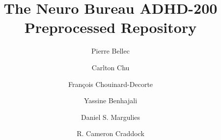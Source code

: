 \documentclass[preprint,12pt,3p]{elsarticle}
\begin{document}
\begin{frontmatter}

\title{The Neuro Bureau ADHD-200 Preprocessed Repository}


\author[label0,label1,label2]{Pierre Bellec}
\address[label0]{The Neuro Bureau}
\address[label1]{Centre de Recherche de l'Institut Universitaire de G\'eriatrie de Montr\'eal, Montr\'eal, CA}
\address[label2]{D\'epartement d'Informatique et de Recherche Op\'erationnelle, Universit\'e de Montr\'eal, Montr\'eal, CA}



\author[label0,label3]{Carlton Chu}
\address[label3]{Google DeepMind, London, UK}

\author[label0,label1,label4]{Fran\c{c}ois Chouinard-Decorte}
\address[label4]{Integrated Program in Neuroscience, McGill University, Montreal, CA}

\author[label0,label1,label5]{Yassine Benhajali}
\address[label5]{D\'epartement d'Anthropologie, Universit\'e de Montr\'eal, Montr\'eal, CA}

\author[label0,label6]{Daniel S. Margulies}
\address[label6]{Max Planck Research Group for Neuroanatomy \& Connectivity, Max Planck Institute for Human Cognitive and Brain Sciences, Leipzig, Germany}

\author[label0,lab7,lab8]{R. Cameron Craddock}
\address[lab7]{Computational Neuroimaging Laboratory, Center for Biomedical Imaging and Neuromodulation, Nathan S. Kline Institute for Psychiatric Research, Orangeburg, NY, USA}
\address[lab8]{Center for the Developing Brain, Child Mind Institute, New York, NY, USA}


\end{frontmatter}
\end{document}
